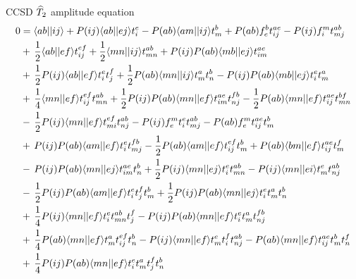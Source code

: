 \begin{frame}{CCSD $\widehat{T}_2$ amplitude equation }
    \scriptsize
\begin{align*}
    0 &= 
        \langle ab| |ij\rangle
        + P(ij) \langle ab||ej\rangle t_i^e
        - P(ab) \langle am| |ij\rangle t_m^b
        + P(ab) f_{e}^b t_{ij}^{ae}
        - P(ij) f_{i}^m t_{mj}^{ab} \\
        & + \, \frac{1}{2} \langle ab||ef\rangle t_{ij}^{ef}
        + \frac{1}{2} \langle mn||ij\rangle t_{mn}^{ab}
        + P(ij) P(ab) \langle mb||ej\rangle t_{im}^{ae} \\
        & + \, \frac{1}{2} P(ij) \langle ab||ef\rangle t_i^e t_j^f
        + \frac{1}{2} P(ab) \langle mn||ij\rangle t_m^a t_n^b
        - P(ij) P(ab) \langle mb||ej\rangle t_i^e t_m^a \\
        & + \, \frac{1}{4} \langle mn||ef\rangle t_{ij}^{ef} t_{mn}^{ab}
        + \frac{1}{2} P(ij) P(ab) \langle mn||ef\rangle t_{im}^{ae} t_{nj}^{fb}
        - \frac{1}{2} P(ab) \langle mn||ef\rangle t_{ij}^{ae} t_{mn}^{bf} \\
        & - \, \frac{1}{2} P(ij) \langle mn||ef\rangle t_{mi}^{ef} t_{nj}^{ab}
        - P(ij) f_{e}^m t_i^e t_{mj}^{ab}
        - P(ab) f_{e}^m t_{ij}^{ae} t_m^b \\
        & + \, P(ij) P(ab) \langle am||ef\rangle t_i^e t_{mj}^{fb}
        - \frac{1}{2} P(ab) \langle am||ef\rangle t_{ij}^{ef} t_m^b
        + P(ab) \langle bm||ef\rangle t_{ij}^{ae} t_m^f \\
        & - \, P(ij) P(ab) \langle mn| |ej\rangle t_{im}^{ae} t_n^b
        + \frac{1}{2} P(ij) \langle mn||ej\rangle t_i^e t_{mn}^{ab}
        -P(ij) \langle mn||ei\rangle t_m^e t_{nj}^{ab} \\
        & - \, \frac{1}{2} P(ij) P(ab) \langle am||ef\rangle t_i^e t_j^f t_m^b
        + \frac{1}{2} P(ij) P(ab) \langle mn||ej\rangle t_i^e t_m^a t_n^b \\
        & + \, \frac{1}{4} P(ij) \langle mn||ef\rangle t_i^e t_{mn}^{ab} t_j^f
        - P(ij) P(ab) \langle mn||ef\rangle t_i^e t_m^a t_{nj}^{fb} \\
        & + \, \frac{1}{4} P(ab) \langle mn||ef\rangle t_m^a t_{ij}^{ef} t_n^b
        - P(ij) \langle mn||ef\rangle t_m^e t_i^f t_{nj}^{ab}
        - P(ab) \langle mn||ef\rangle t_{ij}^{ae} t_m^b t_n^f \\
        & + \, \frac{1}{4} P(ij) P(ab) \langle mn||ef\rangle t_i^e t_m^a t_j^f t_n^b \\
\end{align*}

\end{frame}

    

